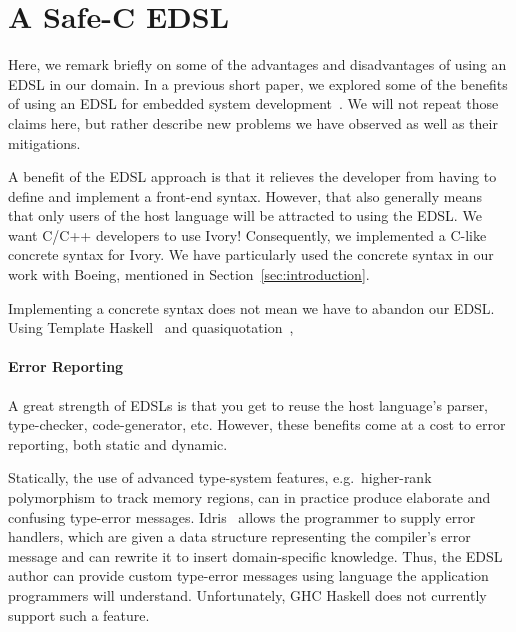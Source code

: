 \section{A Safe-C EDSL}
\label{sec:edsl}

Here, we remark briefly on some of the advantages and disadvantages of using an
EDSL in our domain. In a previous short paper, we explored some of the benefits
of using an EDSL for embedded system development~\cite{smaccm}. We will not
repeat those claims here, but rather describe new problems we have observed as
well as their mitigations.

A benefit of the EDSL approach is that it relieves the developer from having to
define and implement a front-end syntax. However, that also generally means that
only users of the host language will be attracted to using the
EDSL. We want C/C++ developers to use Ivory! Consequently, we implemented a
C-like concrete syntax for Ivory. We have particularly used the concrete syntax
in our work with Boeing, mentioned in Section~\ref{sec:introduction}.

Implementing a concrete syntax does not mean we have to abandon our EDSL. Using
Template Haskell~\cite{} and quasiquotation~\cite{}, 




\paragraph{Error Reporting}
A great strength of EDSLs is that you get to reuse the host language's parser,
type-checker, code-generator, etc. However, these benefits come at a cost to
error reporting, both static and dynamic. 

Statically, the use of advanced type-system features, e.g.\ higher-rank
polymorphism to track memory regions, can in practice produce elaborate and
confusing type-error messages. Idris~\cite{christiansen2014reflect} allows the
programmer to supply error handlers, which are given a data structure
representing the compiler's error message and can rewrite it to insert
domain-specific knowledge. Thus, the EDSL author can provide custom type-error
messages using language the application programmers will understand.
Unfortunately, GHC Haskell does not currently support such a feature.

